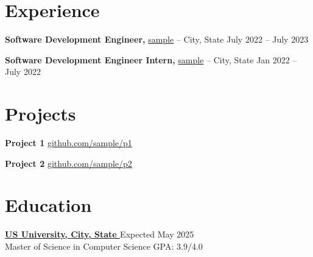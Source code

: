 \vspace{-6.5pt}

\section*{Experience}
\textbf{Software Development Engineer,} \href{https://sample.com/}{sample} -- City, State \hfill July 2022 -- July 2023 \\
\vspace{-9pt}
\begin{itemize}
  \label{sde}
  
\end{itemize}

\textbf{Software Development Engineer Intern,} \href{https://sample.com/}{sample} -- City, State \hfill Jan 2022 -- July 2022 \\
\vspace{-9pt}
\begin{itemize}
  \label{sdei}

\end{itemize}


\vspace{-18.5pt}

\section*{Projects}
\textbf{Project 1} \hfill \href{https://github.com/sample/p1}
{github.com/sample/p1} \\
\vspace{-9pt}
\begin{itemize}
  \label{projects1}

\end{itemize}

\textbf{Project 2} \hfill \href{https://github.com/sample/p2}
{github.com/sample/p2} \\
\vspace{-9pt}
\begin{itemize}
  \label{projects2}

\end{itemize}

\vspace{-18.5pt}

\section*{Education}
\textbf{\href{https://www.northeastern.edu/}{US University, City, State }} \hfill Expected May 2025 \\
Master of Science in Computer Science \hfill GPA: 3.9/4.0 \\

